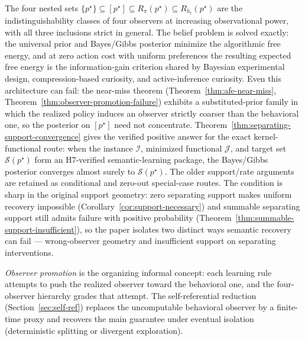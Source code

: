 \documentclass[11pt]{article}
\theoremstyle{definition}
\theoremstyle{remark}
\newcommand{\Scal}{\mathcal{S}}
\begin{document}
The four nested sets $\{p^\star\}\subseteq[p^\star]\subseteq R_\pi(p^\star)\subseteq R_{h_t}(p^\star)$ are the indistinguishability classes of four observers at increasing observational power, with all three inclusions strict in general. The belief problem is solved exactly: the universal prior and Bayes/Gibbs posterior minimize the algorithmic free energy, and at zero action cost with uniform preferences the resulting expected free energy is the information-gain criterion shared by Bayesian experimental design, compression-based curiosity, and active-inference curiosity. Even this architecture can fail: the near-miss theorem (Theorem~\ref{thm:afe-near-miss}, Theorem~\ref{thm:observer-promotion-failure}) exhibits a substituted-prior family in which the realized policy induces an observer strictly coarser than the behavioral one, so the posterior on $[p^\star]$ need not concentrate. Theorem~\ref{thm:separating-support-convergence} gives the verified positive answer for the exact kernel-functional route: when the instance $\mathcal I$, minimized functional $\mathcal J$, and target set $\Scal(p^\star)$ form an H7-verified semantic-learning package, the Bayes/Gibbs posterior converges almost surely to $\Scal(p^\star)$. The older support/rate arguments are retained as conditional and zero-out special-case routes. The condition is sharp in the original support geometry: zero separating support makes uniform recovery impossible (Corollary~\ref{cor:support-necessary}) and summable separating support still admits failure with positive probability (Theorem~\ref{thm:summable-support-insufficient}), so the paper isolates two distinct ways semantic recovery can fail --- wrong-observer geometry and insufficient support on separating interventions.

\emph{Observer promotion} is the organizing informal concept: each learning rule attempts to push the realized observer toward the behavioral one, and the four-observer hierarchy grades that attempt. The self-referential reduction (Section~\ref{sec:self-ref}) replaces the uncomputable behavioral observer by a finite-time proxy and recovers the main guarantee under eventual isolation (deterministic splitting or divergent exploration).
\end{document}
